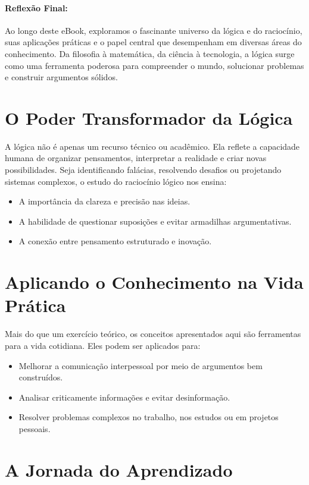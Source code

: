 \documentclass[a4paper,12pt]{book}
\begin{document}
\paragraph{Reflexão Final:}  
Ao longo deste eBook, exploramos o fascinante universo da lógica e do raciocínio, suas aplicações práticas e o papel central que desempenham em diversas áreas do conhecimento. Da filosofia à matemática, da ciência à tecnologia, a lógica surge como uma ferramenta poderosa para compreender o mundo, solucionar problemas e construir argumentos sólidos.

\section*{O Poder Transformador da Lógica}

A lógica não é apenas um recurso técnico ou acadêmico. Ela reflete a capacidade humana de organizar pensamentos, interpretar a realidade e criar novas possibilidades. Seja identificando falácias, resolvendo desafios ou projetando sistemas complexos, o estudo do raciocínio lógico nos ensina:

\begin{itemize}
    \item A importância da clareza e precisão nas ideias.
    \item A habilidade de questionar suposições e evitar armadilhas argumentativas.
    \item A conexão entre pensamento estruturado e inovação.
\end{itemize}

\section*{Aplicando o Conhecimento na Vida Prática}

Mais do que um exercício teórico, os conceitos apresentados aqui são ferramentas para a vida cotidiana. Eles podem ser aplicados para:

\begin{itemize}
    \item Melhorar a comunicação interpessoal por meio de argumentos bem construídos.
    \item Analisar criticamente informações e evitar desinformação.
    \item Resolver problemas complexos no trabalho, nos estudos ou em projetos pessoais.
\end{itemize}

\section*{A Jornada do Aprendizado}
\end{document}
